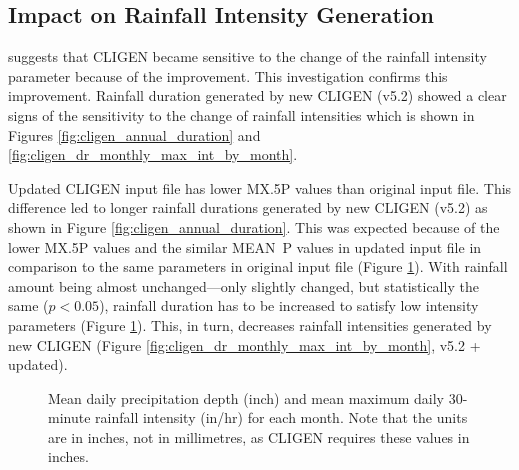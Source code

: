 \subsection{Impact on Rainfall Intensity Generation}

\citet{yu2000-301} suggests that CLIGEN became sensitive to the change of the
rainfall intensity parameter because of the improvement. This investigation
confirms this improvement. Rainfall duration generated by new CLIGEN (v5.2)
showed a clear signs of the sensitivity to the change of rainfall intensities
which is shown in Figures \ref{fig:cligen_annual_duration} and
\ref{fig:cligen_dr_monthly_max_int_by_month}.

Updated CLIGEN input file has lower {MX.5P} values than original input file.
This difference led to longer rainfall durations generated by new CLIGEN (v5.2)
as shown in Figure \ref{fig:cligen_annual_duration}. This was expected because
of the lower {MX.5P} values and the similar MEAN~P values in updated input file
in comparison to the same parameters in original input file (Figure
\ref{fig:mean_p_mx5p_cligen}). With rainfall amount being almost
unchanged---only slightly changed, but statistically the same ($p<0.05$),
rainfall duration has to be increased to satisfy low intensity parameters
(Figure \ref{fig:mean_p_mx5p_cligen}). This, in turn, decreases rainfall
intensities generated by new CLIGEN (Figure
\ref{fig:cligen_dr_monthly_max_int_by_month}, v5.2 + updated).

\begin{figure}[htbp]
  \centering
  \caption[Mean daily precipitation depth and mean maximum daily 30-minute
rainfall intensity for each month]{Mean daily precipitation depth (inch) and
mean maximum daily 30-minute rainfall intensity (in/hr) for each month. Note
that the units are in inches, not in millimetres, as CLIGEN requires these
values in inches.}
  \label{fig:mean_p_mx5p_cligen}
\end{figure}

